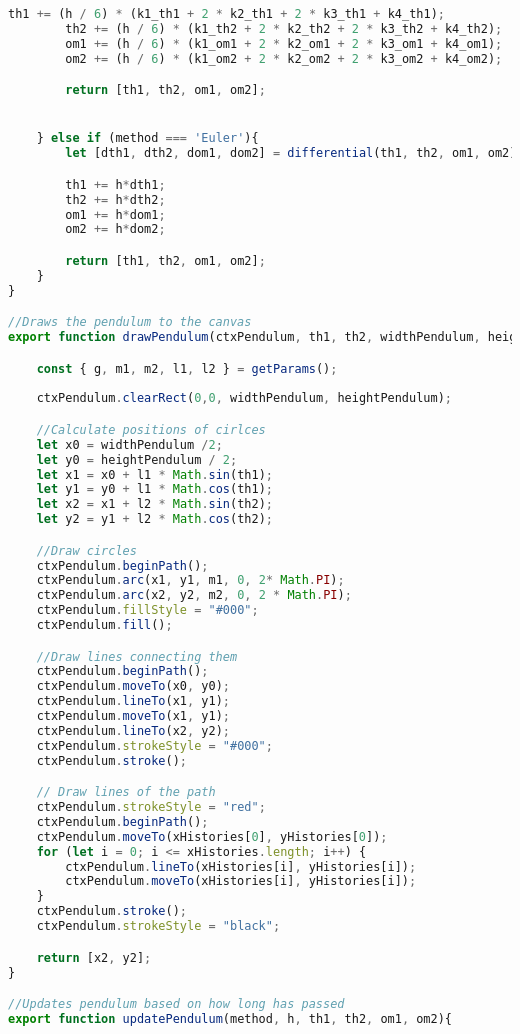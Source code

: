 \documentclass[12pt]{article}
\begin{document}
\begin{lstlisting}[language=JavaScript]
        th1 += (h / 6) * (k1_th1 + 2 * k2_th1 + 2 * k3_th1 + k4_th1);
        th2 += (h / 6) * (k1_th2 + 2 * k2_th2 + 2 * k3_th2 + k4_th2);
        om1 += (h / 6) * (k1_om1 + 2 * k2_om1 + 2 * k3_om1 + k4_om1);
        om2 += (h / 6) * (k1_om2 + 2 * k2_om2 + 2 * k3_om2 + k4_om2);

        return [th1, th2, om1, om2];


    } else if (method === 'Euler'){
        let [dth1, dth2, dom1, dom2] = differential(th1, th2, om1, om2);

        th1 += h*dth1;
        th2 += h*dth2;
        om1 += h*dom1;
        om2 += h*dom2;

        return [th1, th2, om1, om2];
    }
}

//Draws the pendulum to the canvas
export function drawPendulum(ctxPendulum, th1, th2, widthPendulum, heightPendulum) {

    const { g, m1, m2, l1, l2 } = getParams();
    
    ctxPendulum.clearRect(0,0, widthPendulum, heightPendulum);

    //Calculate positions of cirlces
    let x0 = widthPendulum /2;
    let y0 = heightPendulum / 2;
    let x1 = x0 + l1 * Math.sin(th1);
    let y1 = y0 + l1 * Math.cos(th1);
    let x2 = x1 + l2 * Math.sin(th2);
    let y2 = y1 + l2 * Math.cos(th2);

    //Draw circles
    ctxPendulum.beginPath();
    ctxPendulum.arc(x1, y1, m1, 0, 2* Math.PI);
    ctxPendulum.arc(x2, y2, m2, 0, 2 * Math.PI);
    ctxPendulum.fillStyle = "#000";
    ctxPendulum.fill();

    //Draw lines connecting them
    ctxPendulum.beginPath();
    ctxPendulum.moveTo(x0, y0);
    ctxPendulum.lineTo(x1, y1);
    ctxPendulum.moveTo(x1, y1);
    ctxPendulum.lineTo(x2, y2);
    ctxPendulum.strokeStyle = "#000";
    ctxPendulum.stroke();

    // Draw lines of the path
    ctxPendulum.strokeStyle = "red";
    ctxPendulum.beginPath();
    ctxPendulum.moveTo(xHistories[0], yHistories[0]);
    for (let i = 0; i <= xHistories.length; i++) {
        ctxPendulum.lineTo(xHistories[i], yHistories[i]);
        ctxPendulum.moveTo(xHistories[i], yHistories[i]);
    }
    ctxPendulum.stroke();
    ctxPendulum.strokeStyle = "black";

    return [x2, y2];
}

//Updates pendulum based on how long has passed
export function updatePendulum(method, h, th1, th2, om1, om2){


\end{lstlisting}
\end{document}
